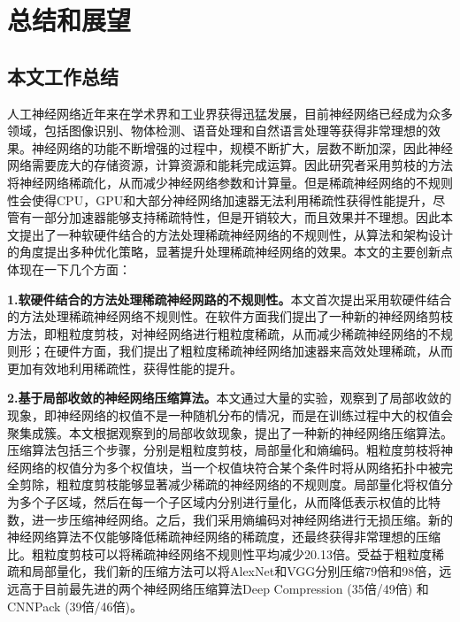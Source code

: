 \chapter{总结和展望}

\section{本文工作总结}
人工神经网络近年来在学术界和工业界获得迅猛发展，目前神经网络已经成为众多领域，包括图像识别、物体检测、语音处理和自然语言处理等获得非常理想的效果。神经网络的功能不断增强的过程中，规模不断扩大，层数不断加深，因此神经网络需要庞大的存储资源，计算资源和能耗完成运算。因此研究者采用剪枝的方法将神经网络稀疏化，从而减少神经网络参数和计算量。但是稀疏神经网络的不规则性会使得CPU，GPU和大部分神经网络加速器无法利用稀疏性获得性能提升，尽管有一部分加速器能够支持稀疏特性，但是开销较大，而且效果并不理想。因此本文提出了一种软硬件结合的方法处理稀疏神经网络的不规则性，从算法和架构设计的角度提出多种优化策略，显著提升处理稀疏神经网络的效果。本文的主要创新点体现在一下几个方面：

\textbf{1.软硬件结合的方法处理稀疏神经网路的不规则性。}本文首次提出采用软硬件结合的方法处理稀疏神经网络不规则性。在软件方面我们提出了一种新的神经网络剪枝方法，即粗粒度剪枝，对神经网络进行粗粒度稀疏，从而减少稀疏神经网络的不规则形；在硬件方面，我们提出了粗粒度稀疏神经网络加速器来高效处理稀疏，从而更加有效地利用稀疏性，获得性能的提升。

\textbf{2.基于局部收敛的神经网络压缩算法。}本文通过大量的实验，观察到了局部收敛的现象，即神经网络的权值不是一种随机分布的情况，而是在训练过程中大的权值会聚集成簇。本文根据观察到的局部收敛现象，提出了一种新的神经网络压缩算法。压缩算法包括三个步骤，分别是粗粒度剪枝，局部量化和熵编码。粗粒度剪枝将神经网络的权值分为多个权值块，当一个权值块符合某个条件时将从网络拓扑中被完全剪除，粗粒度剪枝能够显著减少稀疏的神经网络的不规则度。局部量化将权值分为多个子区域，然后在每一个子区域内分别进行量化，从而降低表示权值的比特数，进一步压缩神经网络。之后，我们采用熵编码对神经网络进行无损压缩。新的神经网络算法不仅能够降低稀疏神经网络的稀疏度，还最终获得非常理想的压缩比。粗粒度剪枝可以将稀疏神经网络不规则性平均减少20.13倍。受益于粗粒度稀疏和局部量化，我们新的压缩方法可以将AlexNet和VGG分别压缩79倍和98倍，远远高于目前最先进的两个神经网络压缩算法Deep Compression (35倍/49倍) 和 CNNPack (39倍/46倍)。

